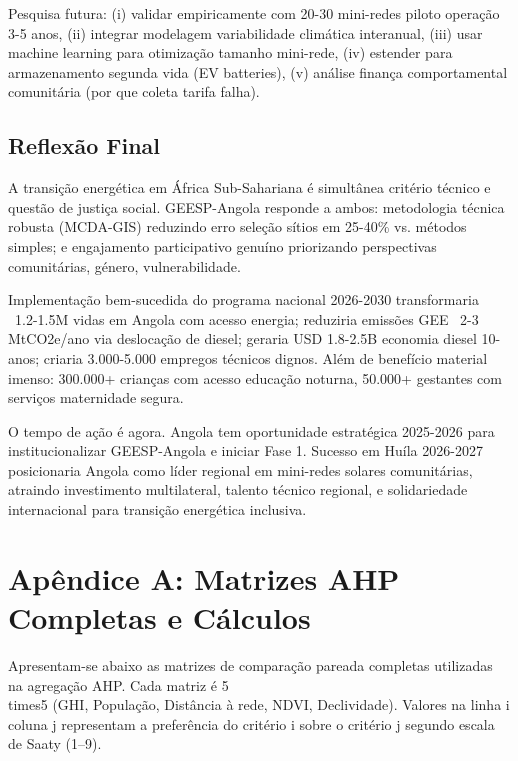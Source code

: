 \documentclass[12pt, a4paper]{article}
\begin{document}
{{{{{{{{{{{{Pesquisa futura: (i) validar empiricamente com 20-30 mini-redes piloto operação 3-5 anos, (ii) integrar modelagem variabilidade climática interanual, (iii) usar machine learning para otimização tamanho mini-rede, (iv) estender para armazenamento segunda vida (EV batteries), (v) análise finança comportamental comunitária (por que coleta tarifa falha).

\subsection{Reflexão Final}

A transição energética em África Sub-Sahariana é simultânea critério técnico e questão de justiça social. GEESP-Angola responde a ambos: metodologia técnica robusta (MCDA-GIS) reduzindo erro seleção sítios em 25-40\% vs. métodos simples; e engajamento participativo genuíno priorizando perspectivas comunitárias, género, vulnerabilidade.

Implementação bem-sucedida do programa nacional 2026-2030 transformaria ~1.2-1.5M vidas em Angola com acesso energia; reduziria emissões GEE ~2-3 MtCO2e/ano via deslocação de diesel; geraria USD 1.8-2.5B economia diesel 10-anos; criaria 3.000-5.000 empregos técnicos dignos. Além de benefício material imenso: 300.000+ crianças com acesso educação noturna, 50.000+ gestantes com serviços maternidade segura.

O tempo de ação é agora. Angola tem oportunidade estratégica 2025-2026 para institucionalizar GEESP-Angola e iniciar Fase 1. Sucesso em Huíla 2026-2027 posicionaria Angola como líder regional em mini-redes solares comunitárias, atraindo investimento multilateral, talento técnico regional, e solidariedade internacional para transição energética inclusiva.

\clearpage
\section*{Apêndice A: Matrizes AHP Completas e Cálculos}

Apresentam-se abaixo as matrizes de comparação pareada completas utilizadas na agregação AHP. Cada matriz é 5\\times5 (GHI, População, Distância à rede, NDVI, Declividade). Valores na linha i coluna j representam a preferência do critério i sobre o critério j segundo escala de Saaty (1--9).

}}}}}}}}}}}}
\end{document}
